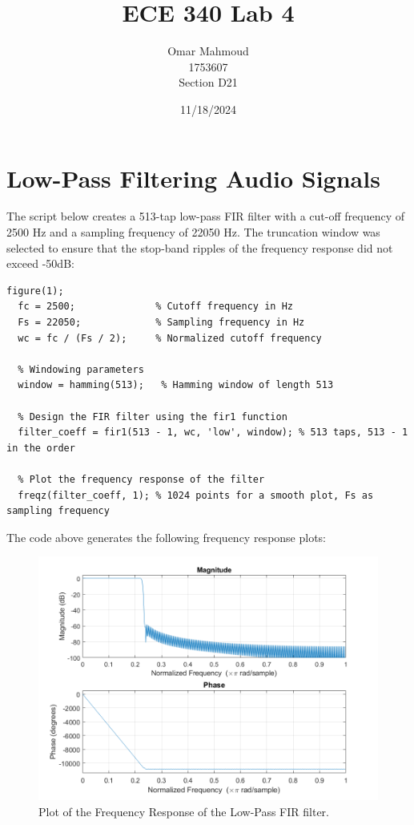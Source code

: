 \documentclass[a4paper, 10pt]{article}
\title{ECE 340 Lab 4}
\author{Omar Mahmoud\\1753607\\Section D21}
\date{11/18/2024}
\begin{document}
\thispagestyle{empty}
\vfill
\maketitle
\vfill

\newpage

\section{Low-Pass Filtering Audio Signals}
The script below creates a 513-tap low-pass FIR filter with a cut-off frequency of 2500 Hz and a sampling frequency of
22050 Hz. The truncation window was selected to ensure that the stop-band ripples of the frequency response did not 
exceed -50dB:
\begin{lstlisting}[style=Matlab-editor, basicstyle=\small\ttfamily]
  figure(1);
  fc = 2500;              % Cutoff frequency in Hz
  Fs = 22050;             % Sampling frequency in Hz
  wc = fc / (Fs / 2);     % Normalized cutoff frequency

  % Windowing parameters
  window = hamming(513);   % Hamming window of length 513

  % Design the FIR filter using the fir1 function
  filter_coeff = fir1(513 - 1, wc, 'low', window); % 513 taps, 513 - 1 in the order

  % Plot the frequency response of the filter
  freqz(filter_coeff, 1); % 1024 points for a smooth plot, Fs as sampling frequency
\end{lstlisting}
The code above generates the following frequency response plots:
\begin{figure}[H]
  \centering
  \includegraphics[width=13cm]{images/q1_b.png}
  \caption{Plot of the Frequency Response of the Low-Pass FIR filter.}
\end{figure}
\end{document}
